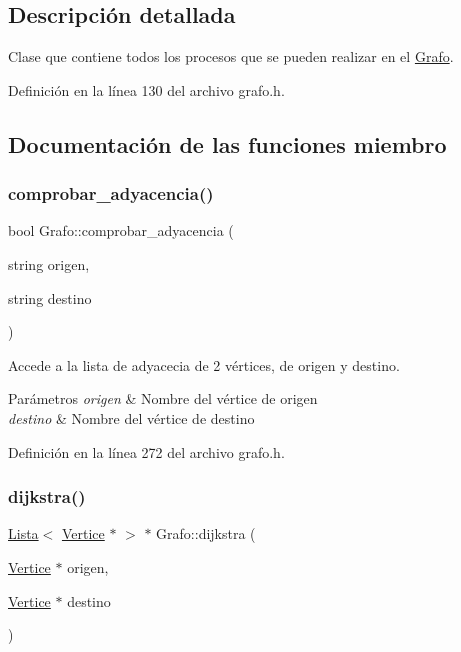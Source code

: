 \subsection{Descripción detallada}
Clase que contiene todos los procesos que se pueden realizar en el \hyperlink{classGrafo}{Grafo}. 

Definición en la línea 130 del archivo grafo.\+h.



\subsection{Documentación de las funciones miembro}
\mbox{\label{classGrafo_a7bfb0f93720820e9d0cb8091f32d69a7}} 
\subsubsection{\texorpdfstring{comprobar\+\_\+adyacencia()}{comprobar\_adyacencia()}}
{\footnotesize\ttfamily bool Grafo\+::comprobar\+\_\+adyacencia (\begin{DoxyParamCaption}\item[{string}]{origen,  }\item[{string}]{destino }\end{DoxyParamCaption})}



Accede a la lista de adyacecia de 2 vértices, de \textquotesingle{}origen\textquotesingle{} y \textquotesingle{}destino\textquotesingle{}. 


\begin{DoxyParams}{Parámetros}
{\em origen} & Nombre del vértice de origen \\
\hline
{\em destino} & Nombre del vértice de destino \\
\hline
\end{DoxyParams}


Definición en la línea 272 del archivo grafo.\+h.

\mbox{\label{classGrafo_a4bb5d2fe50503dd9f6c8042cee3e3631}} 
\subsubsection{\texorpdfstring{dijkstra()}{dijkstra()}}
{\footnotesize\ttfamily \hyperlink{classLista}{Lista}$<$ \hyperlink{classVertice}{Vertice} $\ast$ $>$ $\ast$ Grafo\+::dijkstra (\begin{DoxyParamCaption}\item[{\hyperlink{classVertice}{Vertice} $\ast$}]{origen,  }\item[{\hyperlink{classVertice}{Vertice} $\ast$}]{destino }\end{DoxyParamCaption})}



